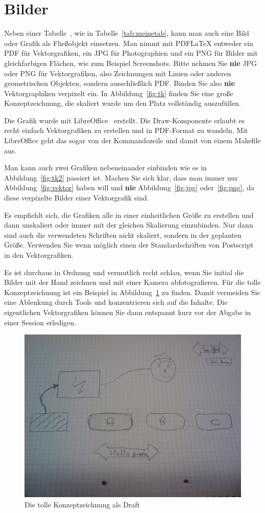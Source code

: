 \documentclass[11pt,a4paper]{report}
\begin{document}
\section{Bilder}

Neben einer Tabelle~\cite{kopka}, wie in Tabelle~\ref{tab:meinetab},
kann man auch eine Bild oder Grafik als Fließobjekt einsetzen.
Man nimmt mit PDFLaTeX entweder ein PDF für Vektorgrafiken,
ein JPG für Photographien und ein PNG für Bilder mit gleichfarbigen
Flächen, wie zum Beispiel Screenshots.
Bitte nehmen Sie \textbf{nie} JPG oder PNG für Vektorgrafiken, 
also Zeichnungen mit Linien oder anderen geometrischen Objekten,
sondern ausschließlich PDF.
Binden Sie also \textbf{nie} Vektorgraphiken verpixelt ein.
In Abbildung~\ref{fig:tk} finden Sie eine große Konzeptzeichnung, 
die skaliert wurde um den Platz vollständig auszufüllen. 


Die Grafik wurde mit LibreOffice~\cite{libreoffice} erstellt. 
Die Draw-Komponente erlaubt es recht einfach Vektorgrafiken zu 
erstellen und in PDF-Format zu wandeln. 
Mit LibreOffice geht das sogar von der Kommandozeile und damit
von einem Makefile aus.

Man kann auch zwei Grafiken nebeneinander einbinden wie es in 
Abbildung~\ref{fig:tk2} passiert ist. 
Machen Sie sich klar, dass man immer nur Abbildung~\ref{fig:vektor}
haben will und \textbf{nie} 
Abbildung~\ref{fig:jpg} oder~\ref{fig:png}, 
da diese verpixelte Bilder einer Vektorgrafik sind.

Es empfiehlt sich, die Grafiken alle in einer einheitlichen Größe
zu erstellen und dann unskaliert oder immer mit der gleichen 
Skalierung einzubinden. 
Nur dann sind auch die verwendeten Schriften nicht skaliert, sondern 
in der geplanten Größe. 
Verwenden Sie wenn möglich einen der Standardschriften von Postscript 
in den Vektorgrafiken.


Es ist durchaus in Ordnung und vermutlich recht schlau, wenn Sie initial 
die Bilder mit der Hand zeichnen und mit einer Kamera abfotografieren. 
Für die tolle Konzeptzeichnung ist ein Beispiel in 
Abbildung~\ref{fig:tkdraft} zu finden. 
Damit vermeiden Sie eine Ablenkung durch Tools und konzentrieren
sich auf die Inhalte. 
Die eigentlichen Vektorgrafiken können Sie dann entspannt kurz vor
der Abgabe in einer Session erledigen. 

\begin{figure}[htb]
\centering
\includegraphics[width=.4\textwidth]{zeichnungdraft} 
\caption{Die tolle Konzeptzeichnung als Draft}
\label{fig:tkdraft}
\end{figure}
\end{document}

